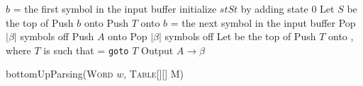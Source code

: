 \documentclass{standalone}
\begin{document}
    \begin{algorithm}[H]
        \label{alg:btmup-parsing}
        \DontPrintSemicolon


        
        \(b\) = the first symbol in the input buffer \;
        initialize \(stSt\) by adding state \(0\) \;
        \While{\t} {
            Let \(S\) be the top of \St \;
             {
                Push \(b\) onto \Symb \;
                Push \(T\) onto \St \;
                \(b\) = the next symbol in the input buffer \;
            }
             {
                Pop \(|\beta|\) symbols off \Symb \;
                Push \(A\) onto \Symb \;
                Pop \(|\beta|\) symbols off \St \;
                Let \Tmp be the top of \St \;
                Push \(T\) onto \St, where \(T\) is such that  = \texttt{goto} \(T\) \;
                Output \(A \to \beta\) \;
            }
             {
                \Return{} \;
            }
            \Else{
                \ferr{}
            }
        }


        \caption{bottomUpParsing(\textsc{Word} \(w\), \textsc{Table}[][] M)}
    \end{algorithm}
\end{document}
